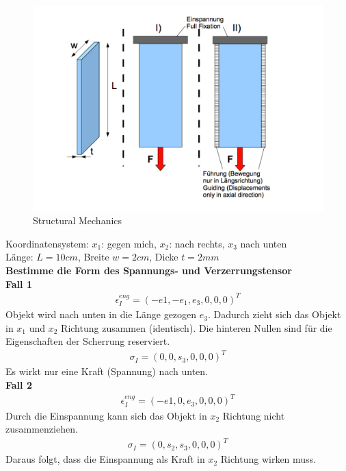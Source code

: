 \begin{figure}[h]
	\begin{center}
		\includegraphics[scale=0.3]{images/structural_mechanics.pdf}
		\caption{Structural Mechanics}
		\label{fig:structuralmechanics}
	\end{center}
\end{figure}

Koordinatensystem: $x_1$: gegen mich, $x_2$: nach rechts, $x_3$ nach unten\\
Länge: $L = 10 cm$, Breite $w=2cm$, Dicke $t=2mm$\\

\textbf{Bestimme die Form des Spannungs- und Verzerrungstensor}\\

\textbf{Fall 1}\\
\begin{align}
	\epsilon_I^{eng} = (-e1, -e_1, e_3, 0, 0, 0)^T
\end{align}
Objekt wird nach unten in die Länge gezogen $e_3$. Dadurch zieht sich
das Objekt in $x_1$ und $x_2$ Richtung zusammen (identisch). Die hinteren
Nullen sind für die Eigenschaften der Scherrung reserviert.\\
\begin{align}
	\sigma_I = (0,0,s_3,0,0,0)^T
\end{align}
Es wirkt nur eine Kraft (Spannung) nach unten.\\

\textbf{Fall 2}\\
\begin{align}
	\epsilon_I^{eng} = (-e1, 0, e_3, 0, 0, 0)^T
\end{align}
Durch die Einspannung kann sich das Objekt in $x_2$ Richtung nicht
zusammenziehen.
\begin{align}
	\sigma_I = (0,s_2,s_3,0,0,0)^T
\end{align}
Daraus folgt, dass die Einspannung als Kraft in $x_2$ Richtung wirken muss.\\

